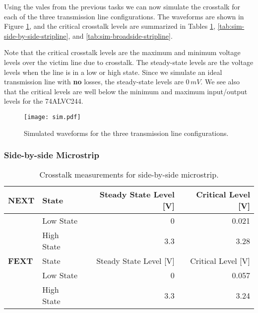\documentclass[../main.tex]{subfiles}
\begin{document}
\solution

Using the vales from the previous tasks we can now simulate the crosstalk for each of the three transmission line configurations. The waveforms are shown in Figure \ref{fig:waveforms}, and the critical crosstalk levels are summarized in Tables \ref{tab:sim-side-by-side-microstrip}, \ref{tab:sim-side-by-side-stripline}, and \ref{tab:sim-broadside-stripline}.

\vspace{10pt}
Note that the critical crosstalk levels are the maximum and minimum voltage levels over the victim line due to crosstalk. The steady-state levels are the voltage levels when the line is in a low or high state. Since we simulate an ideal transmission line with \textbf{no} losses, the steady-state levels are $0\,\si{mV}$. We see also that the critical levels are well below the minimum and maximum input/output levels for the 74ALVC244.

\begin{figure}[h]
    \centering
    \texttt{[image: sim.pdf]}
    \caption{Simulated waveforms for the three transmission line configurations.}
    \label{fig:waveforms}
\end{figure}

\subsubsection{Side-by-side Microstrip}

\begin{table}[h]
    \centering
    \begin{tabular}{l l|r r}
        \toprule[1pt]
        \textbf{NEXT} & State & Steady State Level [V] & Critical Level [V] \\
        \midrule
        & Low State & 0 & 0.021 \\
        & High State & 3.3 & 3.28 \\
        \midrule[1pt]
        \textbf{FEXT} & State & Steady State Level [V] & Critical Level [V] \\
        \midrule
        & Low State & 0 & 0.057 \\
        & High State & 3.3 & 3.24 \\
        \bottomrule[1pt]
    \end{tabular}
    \caption{Crosstalk measurements for side-by-side microstrip.}
    \label{tab:sim-side-by-side-microstrip}
\end{table}

\newpage
\end{document}
